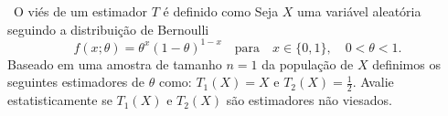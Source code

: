 \documentclass[a4paper,12pt,oneside,onecolumn]{Config/milktest}
\begin{document}
\bigskip


\question \  O viés de um estimador $T$ é definido como  %
Seja $X$ uma variável aleatória seguindo a distribuição de Bernoulli 
$$
f(x;\theta) = \theta^x(1-\theta)^{1-x} \quad \text{para} \quad {x \in \{0,1\}},  \quad  0< \theta<1.
$$
Baseado em uma amostra de tamanho $n=1$ da população de $X$ definimos os seguintes estimadores de $\theta$ como: $T_1(X)=X$ e $T_2(X)=\frac{1}{2}.$  Avalie estatisticamente se $T_1(X)$ e $T_2(X)$ são estimadores não viesados. 

\bigskip










    
\end{document}
